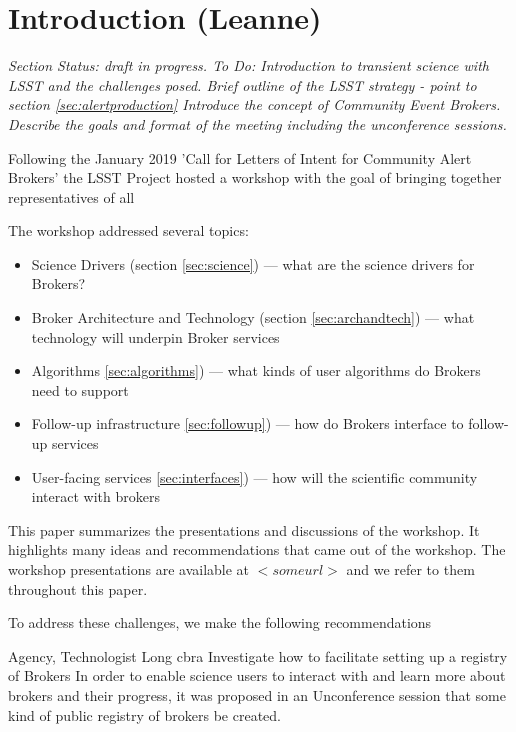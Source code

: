 \section{Introduction (Leanne)} \label{sec:intro}

{\it Section Status: draft in progress. 
To Do: 
Introduction to transient science with LSST and the challenges posed.  
Brief outline of the LSST strategy - point to section \ref{sec:alertproduction}
Introduce the concept of Community Event Brokers.   
Describe the goals and format of the meeting including the unconference sessions. }

Following the January 2019 'Call for Letters of Intent for Community Alert Brokers'  
\citep{LDM-612}
the LSST Project hosted a workshop with the goal of bringing together representatives of all 

The workshop addressed several topics: 
\begin{itemize}
    \item Science Drivers (section \ref{sec:science}) --- what are the science drivers for Brokers?
    \item Broker Architecture and Technology (section \ref{sec:archandtech}) --- what technology will underpin Broker services 
    \item Algorithms \ref{sec:algorithms}) ---  what kinds of user algorithms do Brokers need to support 
    \item Follow-up infrastructure \ref{sec:followup}) --- how do Brokers interface to follow-up services 
    \item User-facing services \ref{sec:interfaces}) --- how will the scientific community interact with brokers 
\end{itemize}

This paper summarizes the presentations and discussions of the workshop. It highlights many ideas and recommendations that came out of the workshop. The workshop presentations are available at $<someurl>$ and we refer to them throughout this paper.


To address these challenges, we make the following recommendations

{Agency, Technologist}
{Long}
{cbra}
{Investigate how to facilitate setting up a registry of Brokers}
{In order to enable science users to interact with and learn more about brokers and their progress, it was proposed in an Unconference session that some kind of public registry of brokers be created.}